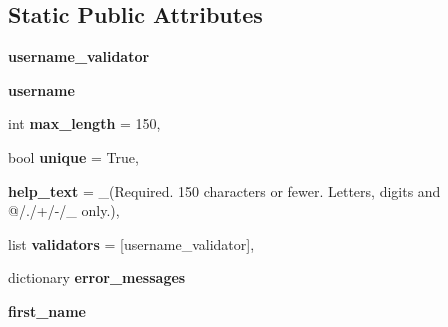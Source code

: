 \subsection*{Static Public Attributes}
\begin{DoxyCompactItemize}
\item 
\mbox{\label{classdjango_1_1contrib_1_1auth_1_1models_1_1_abstract_user_a684c826017352e461c0cb9c3289cec2f}} 
{\bfseries username\+\_\+validator}
\item 
\mbox{\label{classdjango_1_1contrib_1_1auth_1_1models_1_1_abstract_user_ae4395b990f06ad5341135311446acfe6}} 
{\bfseries username}
\item 
\mbox{\label{classdjango_1_1contrib_1_1auth_1_1models_1_1_abstract_user_a05dc3a286c02a353c5c15dd95ec5a3ab}} 
int {\bfseries max\+\_\+length} = 150,
\item 
\mbox{\label{classdjango_1_1contrib_1_1auth_1_1models_1_1_abstract_user_a1a6e30628fcc8055b91562bf70eb0a44}} 
bool {\bfseries unique} = True,
\item 
\mbox{\label{classdjango_1_1contrib_1_1auth_1_1models_1_1_abstract_user_a62878f86fdbbbb3e27ec96e71510194a}} 
{\bfseries help\+\_\+text} = \+\_\+(\textquotesingle{}Required. 150 characters or fewer. Letters, digits and @/./+/-\//\+\_\+ only.\textquotesingle{}),
\item 
\mbox{\label{classdjango_1_1contrib_1_1auth_1_1models_1_1_abstract_user_a1d46b5212494f9c56a8efc5f936037b5}} 
list {\bfseries validators} = \mbox{[}username\+\_\+validator\mbox{]},
\item 
dictionary {\bfseries error\+\_\+messages}
\item 
\mbox{\label{classdjango_1_1contrib_1_1auth_1_1models_1_1_abstract_user_afaa39a637699a856b8b455e8f492f49b}} 
{\bfseries first\+\_\+name}
\item 

\end{DoxyCompactItemize}
